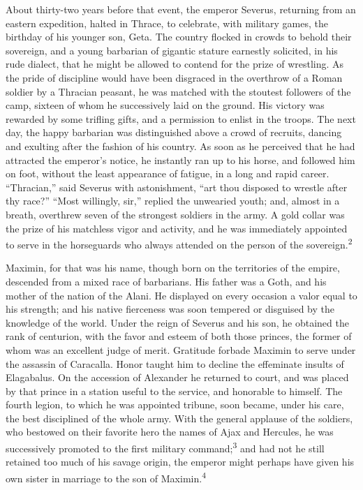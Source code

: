 About thirty-two years before that event, the emperor Severus,
returning from an eastern expedition, halted in Thrace, to
celebrate, with military games, the birthday of his younger son,
Geta. The country flocked in crowds to behold their sovereign,
and a young barbarian of gigantic stature earnestly solicited, in
his rude dialect, that he might be allowed to contend for the
prize of wrestling. As the pride of discipline would have been
disgraced in the overthrow of a Roman soldier by a Thracian
peasant, he was matched with the stoutest followers of the camp,
sixteen of whom he successively laid on the ground. His victory
was rewarded by some trifling gifts, and a permission to enlist
in the troops. The next day, the happy barbarian was
distinguished above a crowd of recruits, dancing and exulting
after the fashion of his country. As soon as he perceived that he
had attracted the emperor’s notice, he instantly ran up to his
horse, and followed him on foot, without the least appearance of
fatigue, in a long and rapid career. “Thracian,” said Severus
with astonishment, “art thou disposed to wrestle after thy race?”
“Most willingly, sir,” replied the unwearied youth; and, almost
in a breath, overthrew seven of the strongest soldiers in the
army. A gold collar was the prize of his matchless vigor and
activity, and he was immediately appointed to serve in the
horseguards who always attended on the person of the sovereign.\textsuperscript{2}


Maximin, for that was his name, though born on the territories of
the empire, descended from a mixed race of barbarians. His father
was a Goth, and his mother of the nation of the Alani. He
displayed on every occasion a valor equal to his strength; and
his native fierceness was soon tempered or disguised by the
knowledge of the world. Under the reign of Severus and his son,
he obtained the rank of centurion, with the favor and esteem of
both those princes, the former of whom was an excellent judge of
merit. Gratitude forbade Maximin to serve under the assassin of
Caracalla. Honor taught him to decline the effeminate insults of
Elagabalus. On the accession of Alexander he returned to court,
and was placed by that prince in a station useful to the service,
and honorable to himself. The fourth legion, to which he was
appointed tribune, soon became, under his care, the best
disciplined of the whole army. With the general applause of the
soldiers, who bestowed on their favorite hero the names of Ajax
and Hercules, he was successively promoted to the first military
command;\textsuperscript{3} and had not he still retained too much of his savage
origin, the emperor might perhaps have given his own sister in
marriage to the son of Maximin.\textsuperscript{4}

